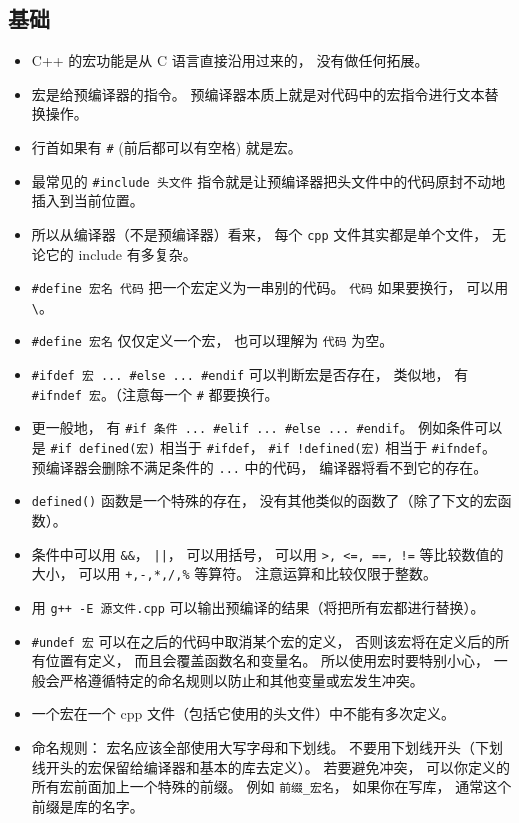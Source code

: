 
\begin{issues}
\issueDraft
\end{issues}


\subsection{基础}
\begin{itemize}
\item C++ 的宏功能是从 C 语言直接沿用过来的， 没有做任何拓展。
\item 宏是给预编译器的指令。 预编译器本质上就是对代码中的宏指令进行文本替换操作。
\item 行首如果有 \verb|#| (前后都可以有空格) 就是宏。
\item 最常见的 \verb|#include 头文件| 指令就是让预编译器把头文件中的代码原封不动地插入到当前位置。
\item 所以从编译器（不是预编译器）看来， 每个 \verb|cpp| 文件其实都是单个文件， 无论它的 include 有多复杂。
\item \verb|#define 宏名 代码| 把一个宏定义为一串别的代码。 \verb|代码| 如果要换行， 可以用 \verb|\|。
\item \verb|#define 宏名| 仅仅定义一个宏， 也可以理解为 \verb|代码| 为空。
\item \verb|#ifdef 宏 ... #else ... #endif| 可以判断宏是否存在， 类似地， 有 \verb|#ifndef 宏|。（注意每一个 \verb|#| 都要换行。
\item 更一般地， 有 \verb|#if 条件 ... #elif ... #else ... #endif|。 例如条件可以是 \verb|#if defined(宏)| 相当于 \verb|#ifdef|， \verb|#if !defined(宏)| 相当于 \verb|#ifndef|。 预编译器会删除不满足条件的 \verb|...| 中的代码， 编译器将看不到它的存在。
\item \verb|defined()| 函数是一个特殊的存在， 没有其他类似的函数了（除了下文的宏函数）。
\item 条件中可以用 \verb|&&|， \verb`||`， 可以用括号， 可以用 \verb|>, <=, ==, !=| 等比较数值的大小， 可以用 \verb|+,-,*,/,%| 等算符。 注意运算和比较仅限于整数。
\item 用 \verb|g++ -E 源文件.cpp| 可以输出预编译的结果（将把所有宏都进行替换）。
\item \verb|#undef 宏| 可以在之后的代码中取消某个宏的定义， 否则该宏将在定义后的所有位置有定义， 而且会覆盖函数名和变量名。 所以使用宏时要特别小心， 一般会严格遵循特定的命名规则以防止和其他变量或宏发生冲突。
\item 一个宏在一个 cpp 文件（包括它使用的头文件）中不能有多次定义。
\item 命名规则： 宏名应该全部使用大写字母和下划线。 不要用下划线开头（下划线开头的宏保留给编译器和基本的库去定义）。 若要避免冲突， 可以你定义的所有宏前面加上一个特殊的前缀。 例如 \verb|前缀_宏名|， 如果你在写库， 通常这个前缀是库的名字。
\end{itemize}

